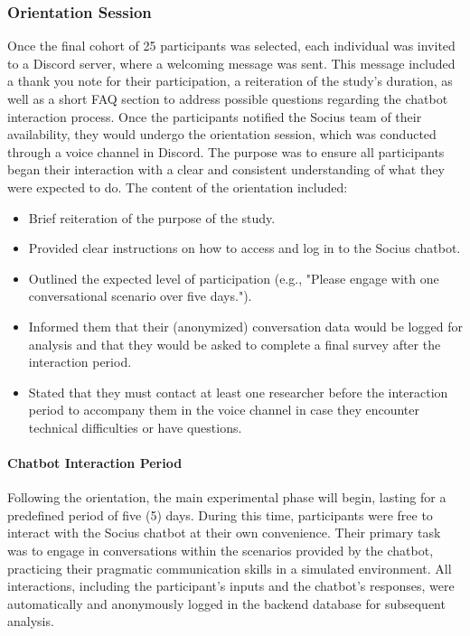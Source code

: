 \subsubsection{Orientation Session}
\indent Once the final cohort of 25 participants was selected, each individual was invited to a Discord server, where a welcoming message was sent. This message included a thank you note for their participation,
a reiteration of the study's duration, as well as a short FAQ section to address possible questions regarding the chatbot interaction process. Once the participants notified the Socius team of their availability, 
they would undergo the orientation session, which was conducted through a voice channel in Discord. The purpose was to ensure all participants began their interaction with a clear and consistent understanding of 
what they were expected to do. The content of the orientation included:
\begin{itemize}
\item Brief reiteration of the purpose of the study.
\item Provided clear instructions on how to access and log in to the Socius chatbot.
\item Outlined the expected level of participation (e.g., "Please engage with one conversational scenario over five days.").
\item Informed them that their (anonymized) conversation data would be logged for analysis and that they would be asked to complete a final survey after the interaction period.
\item Stated that they must contact at least one researcher before the interaction period to accompany them in the voice channel in case they encounter technical difficulties or have questions.
\end{itemize}

\paragraph{Chatbot Interaction Period}
\indent Following the orientation, the main experimental phase will begin, lasting for a predefined period of five (5) days. During this time, participants were free to 
interact with the Socius chatbot at their own convenience. Their primary task was to engage in conversations within the scenarios provided by the chatbot,
practicing their pragmatic communication skills in a simulated environment. All interactions, including the participant's inputs and the chatbot's responses, 
were automatically and anonymously logged in the backend database for subsequent analysis.

